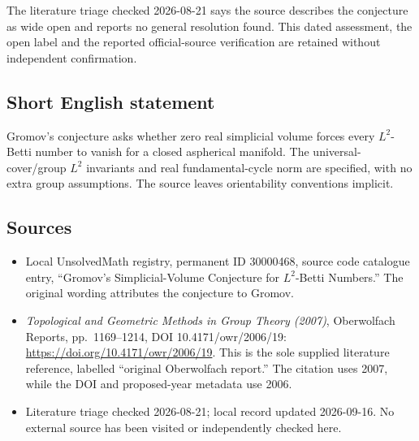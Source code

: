 \documentclass[11pt]{article}
\begin{document}
The literature triage checked 2026-08-21 says the source describes the conjecture as wide open and reports no general resolution found. This dated assessment, the open label and the reported official-source verification are retained without independent confirmation.
\subsection{Short English statement}
Gromov's conjecture asks whether zero real simplicial volume forces every \(L^2\)-Betti number to vanish for a closed aspherical manifold. The universal-cover/group \(L^2\) invariants and real fundamental-cycle norm are specified, with no extra group assumptions. The source leaves orientability conventions implicit.
\subsection{Sources}
\begin{itemize}
\item Local UnsolvedMath registry, permanent ID 30000468, source code catalogue entry, ``Gromov's Simplicial-Volume Conjecture for \(L^2\)-Betti Numbers.'' The original wording attributes the conjecture to Gromov.
\item \emph{Topological and Geometric Methods in Group Theory (2007)}, Oberwolfach Reports, pp.\ 1169--1214, DOI 10.4171/owr/2006/19: \url{https://doi.org/10.4171/owr/2006/19}. This is the sole supplied literature reference, labelled ``original Oberwolfach report.'' The citation uses 2007, while the DOI and proposed-year metadata use 2006.
\item Literature triage checked 2026-08-21; local record updated 2026-09-16. No external source has been visited or independently checked here.
\end{itemize}
\end{document}
